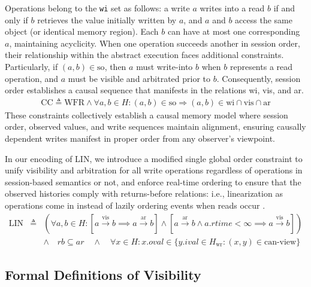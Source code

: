   Operations belong to the \texttt{wi} set as follows: a write $a$
  writes into a read $b$ if and only if $b$ retrieves the value
  initially written
  by $a$, and $a$ and $b$ access the same object (or identical memory region).
  Each $b$ can have at most one corresponding $a$, maintaining acyclicity.
  When one operation succeeds another in session order, their
  relationship within the abstract execution faces additional constraints.
  Particularly, if $(a, b) \in \text{so}$, then $a$ must write-into $b$ when
  $b$ represents a read operation, and $a$ must be visible and
  arbitrated prior to $b$. Consequently, session order establishes a causal
  sequence that manifests in the relations wi, vis, and ar.
  \begin{eqnarray*}
    \text{CC} \triangleq \text{WFR} \land \forall a, b \in H: (a, b) \in
    \text{so} \Rightarrow (a, b) \in \text{wi} \cap \text{vis} \cap \text{ar}
  \end{eqnarray*}
  These constraints collectively establish a causal memory model where
  session order, observed values, and write sequences maintain
  alignment, ensuring
  causally dependent writes manifest in proper order from any
  observer's viewpoint.

   In our encoding of LIN,
  we introduce a modified single global order constraint to unify visibility and
  arbitration for all write operations regardless of operations in
  session-based semantics or not, and enforce real-time ordering to
  ensure that the observed histories comply with returns-before relations:
  i.e., linearization as operations come in instead of lazily ordering
  events when
  reads occur \cite{zhang2018building}.
  \begin{eqnarray*}
    \text{LIN} & \triangleq & (\forall a, b \in H: [a
      \xrightarrow{\text{vis}} b \implies a \xrightarrow{\text{ar}} b] \land  [a \xrightarrow{\text{ar}} b \land a.rtime < \infty \implies
    a \xrightarrow{\text{vis}} b]) \\
    & & \land \quad rb \subseteq ar \quad \land \quad \forall x \in H: x.oval \in \{y.ival \in H_\text{wr} : (x,
    y) \in \text{can-view}\}
  \end{eqnarray*}


  \subsection{Formal Definitions of Visibility}
  \label{subsec:vis}


